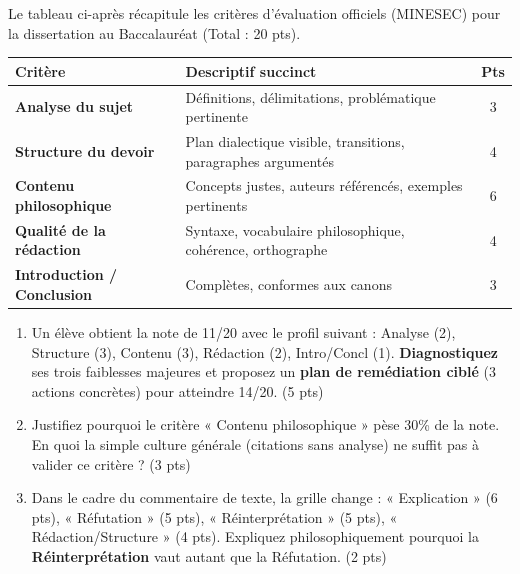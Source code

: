 \documentclass[11pt]{article}
\begin{document}
\begin{exercice}
Le tableau ci-après récapitule les critères d'évaluation officiels (MINESEC) pour la dissertation au Baccalauréat (Total : 20 pts).
\begin{center}
\begin{tabularx}{\linewidth}{|>{\bfseries}l|X|c|}
\hline
\textbf{Critère} & \textbf{Descriptif succinct} & \textbf{Pts} \\ \hline
Analyse du sujet & Définitions, délimitations, problématique pertinente & 3 \\ \hline
Structure du devoir & Plan dialectique visible, transitions, paragraphes argumentés & 4 \\ \hline
Contenu philosophique & Concepts justes, auteurs référencés, exemples pertinents & 6 \\ \hline
Qualité de la rédaction & Syntaxe, vocabulaire philosophique, cohérence, orthographe & 4 \\ \hline
Introduction / Conclusion & Complètes, conformes aux canons & 3 \\ \hline
\end{tabularx}
\end{center}
\begin{enumerate}
    \item Un élève obtient la note de 11/20 avec le profil suivant : Analyse (2), Structure (3), Contenu (3), Rédaction (2), Intro/Concl (1). \textbf{Diagnostiquez} ses trois faiblesses majeures et proposez un \textbf{plan de remédiation ciblé} (3 actions concrètes) pour atteindre 14/20. \hfill (5 pts)
    \item Justifiez pourquoi le critère « Contenu philosophique » pèse 30\% de la note. En quoi la simple culture générale (citations sans analyse) ne suffit pas à valider ce critère ? \hfill (3 pts)
    \item Dans le cadre du commentaire de texte, la grille change : « Explication » (6 pts), « Réfutation » (5 pts), « Réinterprétation » (5 pts), « Rédaction/Structure » (4 pts). Expliquez philosophiquement pourquoi la \textbf{Réinterprétation} vaut autant que la Réfutation. \hfill (2 pts)
\end{enumerate}
\end{exercice}
\end{document}
